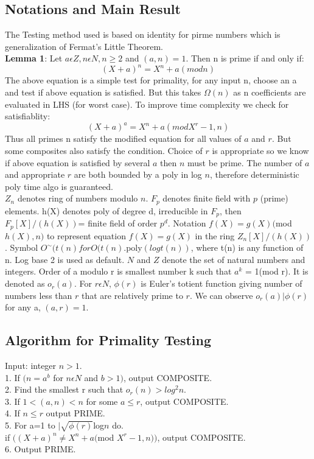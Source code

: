\documentclass[10pt]{article}
\begin{document}
\subsection*{Notations and Main Result}
The Testing method used is based on identity for pirme numbers which is generalization of Fermat's Little Theorem.\\
\textbf {Lemma 1}: Let $a\epsilon Z,n \epsilon N, n \geq 2$ and $(a,n)=1$. Then n is prime if and only if:\\
\[(X+a)^{n}=X^n + a(mod n)\]
The above equation is a simple test for primality, for any input n, choose an a and test if above equation is satisfied. But this takes $\Omega(n)$ as n coefficients are evaluated in LHS (for worst case). To improve time complexity we check for satisfiablity:\\
\[(X + a)^a = X^n + a (mod X^r - 1, n)\]
Thus all primes n satisfy the modified equation for all values of $a$ and $r$. But some composites also satisfy the condition. Choice of $r$ is appropriate so we know if above equation is satisfied by several $a$ then $n$ must be prime. The number of $a$ and appropriate $r$ are both bounded by a poly in log $n$, therefore deterministic poly time algo is guaranteed.\\
\hspace*{0.8cm}$Z_n$ denotes ring of numbers modulo $n$. $F_p$ denotes finite field with $p$ (prime) elements. h(X) denotes poly of degree d, irreducible in $F_p$, then $F_p[X]/(h(X))$= finite field of order $p^d$. Notation $f(X)=g(X)($mod $ h(X),n)$ to represent equation $f(X)=g(X)$ in the ring $Z_n[X]/(h(X))$. Symbol $O^\sim(t(n) for O (t(n).$poly$(log t(n))$, where t(n) is any function of n. Log base 2 is used as default. $N$ and $Z$ denote the set of natural numbers and integers. Order of a modulo r is smallest number k such that $a^k$ = 1(mod r). It is denoted as $o_r(a)$. For $r\epsilon N$, $\phi(r)$ is Euler's totient function giving number of numbers less than $r$ that are relatively prime to $r$. We can observe $o_r(a)| \phi (r)$ for any a, $(a,r)=1$.


\subsection*{Algorithm for Primality Testing}
Input: integer $n>1$.\\
1. If $(n=a^b$ for $n \epsilon N$ and $b>1)$, output COMPOSITE.\\
2. Find the smallest r such that $o_r(n) > log^2n$.\\
3. If $1 < (a,n)< n$ for some $a \leq r$, output COMPOSITE.\\
4. If $n \leq r$ output PRIME.\\
5. For a=1 to $|\sqrt {\phi(r)}$log$ n$ do.\\
\hspace*{0.8cm}if $((X+a)^n \neq X^n +a ($mod $X^r - 1,n))$, output COMPOSITE.\\
6. Output PRIME.\\
\end{document}
